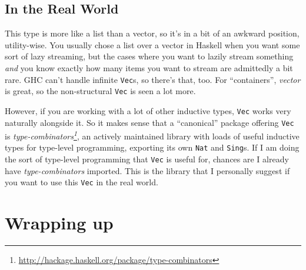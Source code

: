 \documentclass[]{article}
\newenvironment{Shaded}{}{}
\newcommand{\DataTypeTok}[1]{\textcolor[rgb]{0.56,0.13,0.00}{#1}}
\newcommand{\CommentTok}[1]{\textcolor[rgb]{0.38,0.63,0.69}{\textit{#1}}}
\newcommand{\OtherTok}[1]{\textcolor[rgb]{0.00,0.44,0.13}{#1}}
\newcommand{\FunctionTok}[1]{\textcolor[rgb]{0.02,0.16,0.49}{#1}}
\newcommand{\NormalTok}[1]{#1}
\renewcommand{\href}[2]{#2\footnote{\url{#1}}}
\begin{document}
\begin{Shaded}
\end{Shaded}

\subsection{In the Real World}\label{in-the-real-world}

This type is more like a list than a vector, so it's in a bit of an awkward
position, utility-wise. You usually chose a list over a vector in Haskell when
you want some sort of lazy streaming, but the cases where you want to lazily
stream something \emph{and} you know exactly how many items you want to stream
are admittedly a bit rare. GHC can't handle infinite \texttt{Vec}s, so there's
that, too. For ``containers'', \emph{vector} is great, so the non-structural
\texttt{Vec} is seen a lot more.

However, if you are working with a lot of other inductive types, \texttt{Vec}
works very naturally alongside it. So it makes sense that a ``canonical''
package offering \texttt{Vec} is
\emph{\href{http://hackage.haskell.org/package/type-combinators}{type-combinators}},
an actively maintained library with loads of useful inductive types for
type-level programming, exporting its own \texttt{Nat} and \texttt{Sing}s. If I
am doing the sort of type-level programming that \texttt{Vec} is useful for,
chances are I already have \emph{type-combinators} imported. This is the library
that I personally suggest if you want to use this \texttt{Vec} in the real
world.

\section{Wrapping up}\label{wrapping-up}
\end{document}
